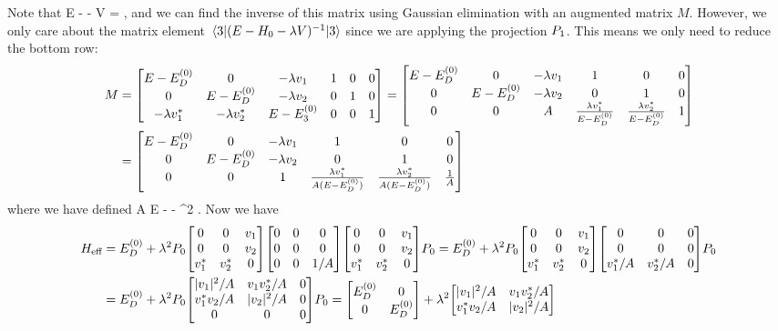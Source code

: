\begin{solution}
	Note that
	\beq
		E - \Ho - \lam V = ,
	\eeq
	and we can find the inverse of this matrix using Gaussian elimination with an augmented matrix $M$.  However, we only care about the matrix element $\mel{3}{(E - H_0- \lambda V)^{-1}}{3}$ since we are applying the projection $P_1$.  This means we only need to reduce the bottom row:
	\begin{align*}
		M &= \mqty[ E - \Eod & 0 & -\lam \vq & 1 & 0 & 0 \\ 0 & E - \Eod & -\lam \vw & 0 & 1 & 0 \\ -\lam \vqs & -\lam \vws & E - \Eoe & 0 & 0 & 1 ]
		= \mqty[ E - \Eod & 0 & -\lam \vq & 1 & 0 & 0 \\ 0 & E - \Eod & -\lam \vw & 0 & 1 & 0 \\ 0 & 0 & A & \frac{\lam \vqs}{E - \Eod} & \frac{\lam \vws}{E - \Eod} & 1 ] \\
		&= \mqty[ E - \Eod & 0 & -\lam \vq & 1 & 0 & 0 \\ 0 & E - \Eod & -\lam \vw & 0 & 1 & 0 \\ 0 & 0 & 1 & \frac{\lam \vqs}{A (E - \Eod)} & \frac{\lam \vws}{A (E - \Eod)} & \frac{1}{A} ]
	\end{align*}
	where we have defined
	\beqn \label{A}
		A \equiv E - \Eoe - \lam^2 .
	\eeqn
	Now we have
	\begin{align*}
		\Heff &= \Eod + \lam^2 \Po \mqty[ 0 & 0 & \vq \\ 0 & 0 & \vw \\ \vqs & \vws & 0 ] \mqty[ 0 & 0 & 0 \\ 0 & 0 & 0 \\ 0 & 0 & 1/A ] \mqty[ 0 & 0 & \vq \\ 0 & 0 & \vw \\ \vqs & \vws & 0 ] \Po
		= \Eod + \lam^2 \Po \mqty[ 0 & 0 & \vq \\ 0 & 0 & \vw \\ \vqs & \vws & 0 ] \mqty[ 0 & 0 & 0 \\ 0 & 0 & 0 \\ \vqs/A & \vws/A & 0 ] \Po \\
		&= \Eod + \lam^2 \Po \mqty[ |\vq|^2 / A & \vq \vws / A & 0 \\ \vqs \vw / A & |\vw|^2 / A & 0 \\ 0 & 0 & 0 ] \Po
		= \mqty[ \Eod & 0 \\ 0 & \Eod ] + \lam^2 \mqty[ |\vq|^2 / A & \vq \vws / A \\ \vqs \vw / A & |\vw|^2 / A ] \\

\end{align*}
\end{solution}
